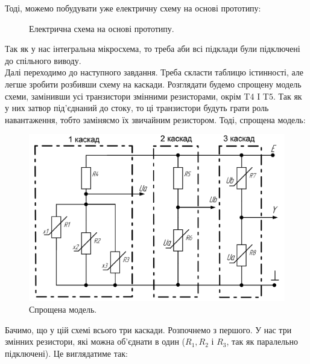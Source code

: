 \documentclass[a4paper,14pt]{extreport}
\begin{document}
  Тоді, можемо побудувати уже електричну схему на основі прототипу:
  \begin{figure}[h!]
  \caption{Електрична схема на основі прототипу.}
  \label{ris2}
  \end{figure}
  Так як у нас інтегральна мікросхема, то треба аби всі підклади були підключені до спільного виводу.\\
  \newpage
  Далі переходимо до наступного завдання. Треба скласти таблицю істинності, але легше зробити розбивши схему на каскади. Розглядати будемо спрощену модель схеми, замінивши усі транзистори змінними резисторами, окрім T4 I T5. Так як у них затвор під’єднаний до стоку, то ці транзистори будуть грати роль навантаження, тобто заміняємо їх звичайним резистором. Тоді, спрощена модель:
  \begin{figure}[h!]
    \begin{center}\includegraphics[width=0.7\linewidth]{3-a.png}\end{center}
    \caption{Спрощена модель.}
    \label{ris3}
  \end{figure}


  Бачимо, що у цій схемі всього три каскади. Розпочнемо з першого. У нас три змінних резистори, які можна об’єднати в один ($R_1, R_2$ і $R_3$, так як паралельно підключені). Це виглядатиме так:
  \begin{figure}[h!]
    \label{ris4}
  \end{figure}
\end{document}
